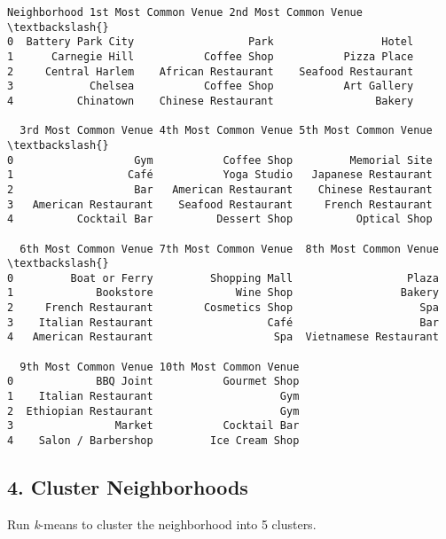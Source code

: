 \documentclass[11pt]{article}
\makeatletter
\newcommand{\boxspacing}{\kern\kvtcb@left@rule\kern\kvtcb@boxsep}
\newcommand{\prompt}[4]{
        \ttfamily\llap{{\color{#2}[#3]:\hspace{3pt}#4}}\vspace{-\baselineskip}
    }
\makeatother
\begin{document}
            \begin{tcolorbox}[breakable, size=fbox, boxrule=.5pt, pad at break*=1mm, opacityfill=0]
\prompt{Out}{outcolor}{63}{\boxspacing}
\begin{Verbatim}[commandchars=\\\{\}]
        Neighborhood 1st Most Common Venue 2nd Most Common Venue  \textbackslash{}
0  Battery Park City                  Park                 Hotel
1      Carnegie Hill           Coffee Shop           Pizza Place
2     Central Harlem    African Restaurant    Seafood Restaurant
3            Chelsea           Coffee Shop           Art Gallery
4          Chinatown    Chinese Restaurant                Bakery

  3rd Most Common Venue 4th Most Common Venue 5th Most Common Venue  \textbackslash{}
0                   Gym           Coffee Shop         Memorial Site
1                  Café           Yoga Studio   Japanese Restaurant
2                   Bar   American Restaurant    Chinese Restaurant
3   American Restaurant    Seafood Restaurant     French Restaurant
4          Cocktail Bar          Dessert Shop          Optical Shop

  6th Most Common Venue 7th Most Common Venue  8th Most Common Venue  \textbackslash{}
0         Boat or Ferry         Shopping Mall                  Plaza
1             Bookstore             Wine Shop                 Bakery
2     French Restaurant        Cosmetics Shop                    Spa
3    Italian Restaurant                  Café                    Bar
4   American Restaurant                   Spa  Vietnamese Restaurant

  9th Most Common Venue 10th Most Common Venue
0             BBQ Joint           Gourmet Shop
1    Italian Restaurant                    Gym
2  Ethiopian Restaurant                    Gym
3                Market           Cocktail Bar
4    Salon / Barbershop         Ice Cream Shop
\end{Verbatim}
\end{tcolorbox}
        
    

    \hypertarget{cluster-neighborhoods}{%
\subsection{4. Cluster Neighborhoods}\label{cluster-neighborhoods}}

    Run \emph{k}-means to cluster the neighborhood into 5 clusters.
\end{document}
